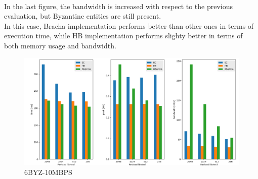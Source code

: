 \documentclass[12pt]{article}
\begin{document}
\\
In the last figure, the bandwidth is increased with respect to the previous evaluation, but Byzantine entities are still present. \\
In this case, Bracha implementation performs better than other ones in terms of execution time, while HB implementation performs slighty better in terms of both memory usage and bandwidth.\\
\begin{figure}
\centering
\includegraphics[scale=0.4]{BAR-BYZ-BW-10MBPS-20.png}
\caption{6BYZ-10MBPS}
\label{fig:mesh7}
\end{figure}

\newpage
\end{document}

